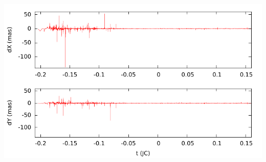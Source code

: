 \begin{frame}
	\begin{center}
		\includegraphics[width=1.0\textwidth]{Figures/fit_amplitude_obs-ser.pdf}
	\end{center}
\end{frame}
